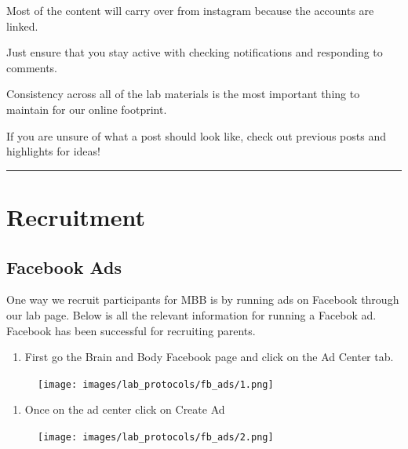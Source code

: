 \documentclass[
]{book}
\providecommand{\tightlist}{%
  \setlength{\itemsep}{0pt}\setlength{\parskip}{0pt}}
\begin{document}
Most of the content will carry over from instagram because the accounts are linked.

Just ensure that you stay active with checking notifications and responding to comments.

Consistency across all of the lab materials is the most important thing to maintain for our online footprint.

If you are unsure of what a post should look like, check out previous posts and highlights for ideas!

\begin{center}\rule{0.5\linewidth}{0.5pt}\end{center}

\hypertarget{recruitment}{%
\section{Recruitment}\label{recruitment}}

\hypertarget{facebook-ads}{%
\subsection{Facebook Ads}\label{facebook-ads}}

One way we recruit participants for MBB is by running ads on Facebook through our lab page. Below is all the relevant information for running a Facebok ad. Facebook has been successful for recruiting parents.

\begin{enumerate}
\def\labelenumi{\arabic{enumi}.}
\tightlist
\item
  First go the Brain and Body Facebook page and click on the Ad Center tab.
\end{enumerate}

\begin{figure}
\centering
\texttt{[image: images/lab\_protocols/fb\_ads/1.png]}
\caption{}
\end{figure}

\begin{enumerate}
\def\labelenumi{\arabic{enumi}.}
\setcounter{enumi}{1}
\tightlist
\item
  Once on the ad center click on Create Ad
\end{enumerate}

\begin{figure}
\centering
\texttt{[image: images/lab\_protocols/fb\_ads/2.png]}
\caption{}
\end{figure}
\end{document}
